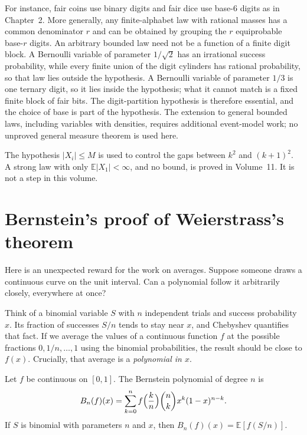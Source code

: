For instance, fair coins use binary digits and fair dice use base-$6$ digits as in Chapter~2. More generally, any finite-alphabet law with rational masses has a common denominator $r$ and can be obtained by grouping the $r$ equiprobable base-$r$ digits. An arbitrary bounded law need not be a function of a finite digit block. A Bernoulli variable of parameter $1/\sqrt2$ has an irrational success probability, while every finite union of the digit cylinders has rational probability, so that law lies outside the hypothesis. A Bernoulli variable of parameter $1/3$ is one ternary digit, so it lies inside the hypothesis; what it cannot match is a fixed finite block of fair bits. The digit-partition hypothesis is therefore essential, and the choice of base is part of the hypothesis. The extension to general bounded laws, including variables with densities, requires additional event-model work; no unproved general measure theorem is used here.

The hypothesis $|X_i|\le M$ is used to control the gaps between $k^2$ and $(k+1)^2$. A strong law with only $\mathbb E|X_1|<\infty$, and no bound, is proved in Volume~11. It is not a step in this volume.

\section{Bernstein's proof of Weierstrass's theorem}

Here is an unexpected reward for the work on averages. Suppose someone draws a continuous curve on the unit interval. Can a polynomial follow it arbitrarily closely, everywhere at once?

Think of a binomial variable $S$ with $n$ independent trials and success probability $x$. Its fraction of successes $S/n$ tends to stay near $x$, and Chebyshev quantifies that fact. If we average the values of a continuous function $f$ at the possible fractions $0,1/n,\ldots,1$ using the binomial probabilities, the result should be close to $f(x)$. Crucially, that average is a \emph{polynomial in $x$}.

Let $f$ be continuous on $[0,1]$. The Bernstein polynomial of degree $n$ is
\[
 B_n(f)(x)=\sum_{k=0}^n f\Bigl(\frac kn\Bigr)\binom{n}{k}x^k(1-x)^{n-k}.
\]
If $S$ is binomial with parameters $n$ and $x$, then $B_n(f)(x)=\mathbb E[f(S/n)]$.

